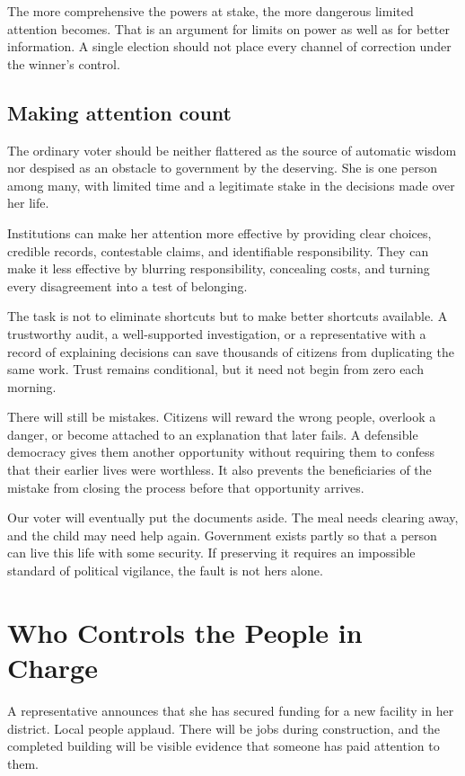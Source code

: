 \documentclass[12pt,a4paper]{book}
\begin{document}
The more comprehensive the powers at stake, the more dangerous limited attention becomes. That is an argument for limits on power as well as for better information. A single election should not place every channel of correction under the winner's control.

\section*{Making attention count}

The ordinary voter should be neither flattered as the source of automatic wisdom nor despised as an obstacle to government by the deserving. She is one person among many, with limited time and a legitimate stake in the decisions made over her life.

Institutions can make her attention more effective by providing clear choices, credible records, contestable claims, and identifiable responsibility. They can make it less effective by blurring responsibility, concealing costs, and turning every disagreement into a test of belonging.

The task is not to eliminate shortcuts but to make better shortcuts available. A trustworthy audit, a well-supported investigation, or a representative with a record of explaining decisions can save thousands of citizens from duplicating the same work. Trust remains conditional, but it need not begin from zero each morning.

There will still be mistakes. Citizens will reward the wrong people, overlook a danger, or become attached to an explanation that later fails. A defensible democracy gives them another opportunity without requiring them to confess that their earlier lives were worthless. It also prevents the beneficiaries of the mistake from closing the process before that opportunity arrives.

Our voter will eventually put the documents aside. The meal needs clearing away, and the child may need help again. Government exists partly so that a person can live this life with some security. If preserving it requires an impossible standard of political vigilance, the fault is not hers alone.

\chapter{Who Controls the People in Charge}

A representative announces that she has secured funding for a new facility in her district. Local people applaud. There will be jobs during construction, and the completed building will be visible evidence that someone has paid attention to them.
\end{document}
